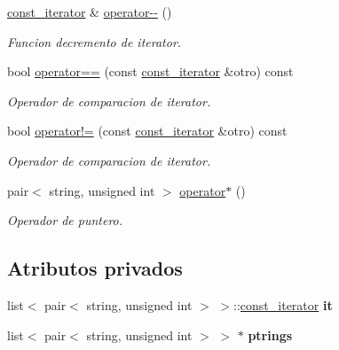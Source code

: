 \begin{DoxyCompactItemize}
\hyperlink{classreceta_1_1const__iterator}{const\+\_\+iterator} \& \hyperlink{classreceta_1_1const__iterator_a513bb8ea8afe6c3a49dd240588800ded}{operator-\/-\/} ()
\begin{DoxyCompactList}\small\item\em Funcion decremento de iterator. \end{DoxyCompactList}\item 
bool \hyperlink{classreceta_1_1const__iterator_adc1f0fe577017a54ce1d593e80b417fd}{operator==} (const \hyperlink{classreceta_1_1const__iterator}{const\+\_\+iterator} \&otro) const
\begin{DoxyCompactList}\small\item\em Operador de comparacion de iterator. \end{DoxyCompactList}\item 
bool \hyperlink{classreceta_1_1const__iterator_aaba8aa502a2f4e92d3f8a64c68787ff6}{operator!=} (const \hyperlink{classreceta_1_1const__iterator}{const\+\_\+iterator} \&otro) const
\begin{DoxyCompactList}\small\item\em Operador de comparacion de iterator. \end{DoxyCompactList}\item 
pair$<$ string, unsigned int $>$ \hyperlink{classreceta_1_1const__iterator_af0293173fe41022e8307d70405a1a592}{operator$\ast$} ()
\begin{DoxyCompactList}\small\item\em Operador de puntero. \end{DoxyCompactList}\end{DoxyCompactItemize}
\subsection*{Atributos privados}
\begin{DoxyCompactItemize}
\item 
\mbox{\label{classreceta_1_1const__iterator_ad7cec20d2890ab525a3bc42b38cb1dab}} 
list$<$ pair$<$ string, unsigned int $>$ $>$\+::\hyperlink{classreceta_1_1const__iterator}{const\+\_\+iterator} {\bfseries it}
\item 
\mbox{\label{classreceta_1_1const__iterator_aa0a1365a4f123ca69282490e1dd5b71d}} 
list$<$ pair$<$ string, unsigned int $>$ $>$ $\ast$ {\bfseries ptrings}
\end{DoxyCompactItemize}
